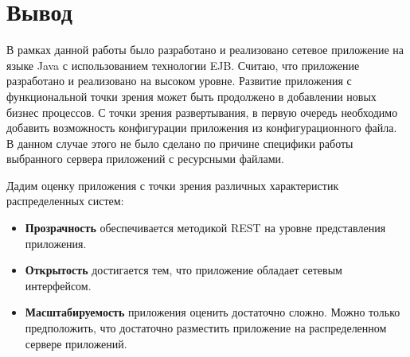 \section{Вывод}

В рамках данной работы было разработано и реализовано сетевое приложение на языке Java с использованием технологии EJB. Считаю, что приложение
разработано и реализовано на высоком уровне. Развитие приложения с функциональной точки зрения может быть продолжено в добавлении новых
бизнес процессов. С точки зрения развертывания, в первую очередь необходимо добавить возможность конфигурации приложения из конфигурационного
файла. В данном случае этого не было сделано по причине специфики работы выбранного сервера приложений с ресурсными файлами.

Дадим оценку приложения с точки зрения различных характеристик распределенных систем:
\begin{itemize}
    \item \textbf{Прозрачность} обеспечивается методикой REST на уровне представления приложения. 
    \item \textbf{Открытость} достигается тем, что приложение обладает сетевым интерфейсом. 
    \item \textbf{Масштабируемость} приложения оценить достаточно сложно. Можно только предположить, что достаточно разместить приложение 
        на распределенном сервере приложений.
\end{itemize} 